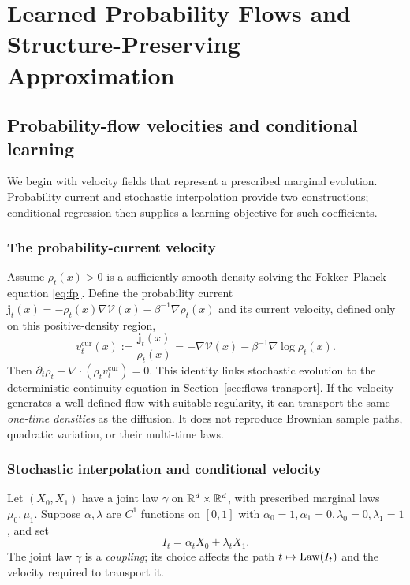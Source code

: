 \documentclass[12pt,a4paper,oneside]{book}
\begin{document}
\section{Learned Probability Flows and Structure-Preserving Approximation}
\label{sec:learnedflows}\label{ch:learnedflows}
\subsection{Probability-flow velocities and conditional learning}
We begin with velocity fields that represent a prescribed marginal
evolution. Probability current and stochastic interpolation provide
two constructions; conditional regression then supplies a learning
objective for such coefficients.

\subsubsection{The probability-current velocity}
Assume $\rho_t(x)>0$ is a sufficiently smooth density solving the
Fokker--Planck equation \eqref{eq:fp}. Define the probability current
$\boldsymbol j_t(x)=-\rho_t(x)\nabla\mathcal V(x)-\beta^{-1}\nabla\rho_t(x)$ and its current
velocity, defined only on this positive-density region,
\begin{equation*}
v_t^{\mathrm{cur}}(x):=\frac{\boldsymbol j_t(x)}{\rho_t(x)}
 =-\nabla\mathcal V(x)-\beta^{-1}\nabla\log\rho_t(x).
\end{equation*}
Then $\partial_t\rho_t+\nabla\cdot(\rho_tv_t^{\mathrm{cur}})=0$.
This identity links stochastic evolution to the deterministic continuity
equation in Section~\ref{sec:flows-transport}. If the velocity generates a
well-defined flow with suitable regularity, it can transport the same
\emph{one-time densities} as the diffusion. It does not reproduce
Brownian sample paths, quadratic variation, or their multi-time laws.

\subsubsection{Stochastic interpolation and conditional velocity}
Let $(X_0,X_1)$ have a joint law $\gamma$ on $\mathbb{R}^d\times\mathbb{R}^d$, with
prescribed marginal laws $\mu_0,\mu_1$. Suppose $\alpha,\lambda$ are
$C^1$ functions on $[0,1]$ with
$\alpha_0=1,\alpha_1=0,\lambda_0=0,\lambda_1=1$, and set
\begin{equation*}
I_t=\alpha_tX_0+\lambda_tX_1.
\end{equation*}
The joint law $\gamma$ is a \emph{coupling}; its choice affects the
path $t\mapsto\operatorname{Law}(I_t)$ and the velocity required to transport it.
\end{document}
